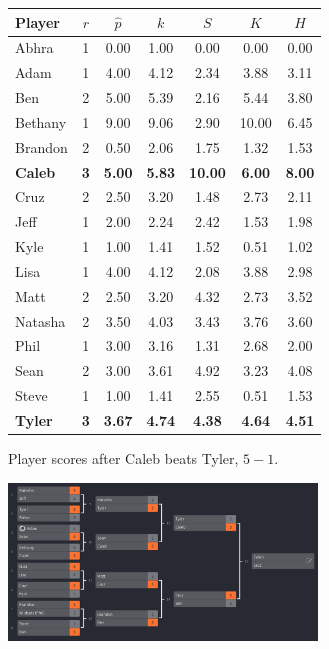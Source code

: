 \documentclass[letterpaper, 10 pt, conference]{ieeeconf}  %
\begin{document}
\begin{figure}
\begin{subfigure}[hb]{0.4\textwidth}
                \footnotesize
                \centering
                \begin{tabular}{lccc|ccc}
                        Player	&	$r$	&	$\hat{p}$	&	$k$	&	$S$	&	$K$	&	$H$	\\
                        \midrule													
                        Abhra	&	1	&	0.00	&	1.00	&	0.00	&	0.00	&	0.00	\\
                        Adam	&	1	&	4.00	&	4.12	&	2.34	&	3.88	&	3.11	\\
                        Ben	&	2	&	5.00	&	5.39	&	2.16	&	5.44	&	3.80	\\
                        Bethany	&	1	&	9.00	&	9.06	&	2.90	&	10.00	&	6.45	\\
                        Brandon	&	2	&	0.50	&	2.06	&	1.75	&	1.32	&	1.53	\\
                        \textbf{Caleb}	&	\textbf{3}	&	\textbf{5.00}	&	\textbf{5.83}	&	\textbf{10.00}	&	\textbf{6.00}	&	\textbf{8.00}	\\
                        Cruz	&	2	&	2.50	&	3.20	&	1.48	&	2.73	&	2.11	\\
                        Jeff	&	1	&	2.00	&	2.24	&	2.42	&	1.53	&	1.98	\\
                        Kyle	&	1	&	1.00	&	1.41	&	1.52	&	0.51	&	1.02	\\
                        Lisa	&	1	&	4.00	&	4.12	&	2.08	&	3.88	&	2.98	\\
                        Matt	&	2	&	2.50	&	3.20	&	4.32	&	2.73	&	3.52	\\
                        Natasha	&	2	&	3.50	&	4.03	&	3.43	&	3.76	&	3.60	\\
                        Phil	&	1	&	3.00	&	3.16	&	1.31	&	2.68	&	2.00	\\
                        Sean	&	2	&	3.00	&	3.61	&	4.92	&	3.23	&	4.08	\\
                        Steve	&	1	&	1.00	&	1.41	&	2.55	&	0.51	&	1.53	\\
                        \textbf{Tyler}	&	\textbf{3}	&	\textbf{3.67}	&	\textbf{4.74}	&	\textbf{4.38}	&	\textbf{4.64}	&	\textbf{4.51}	\\
                \end{tabular}
                \caption{Player scores after Caleb beats Tyler, $5-1$.}
        \end{subfigure}
        \begin{subfigure}[ht]{0.5\textwidth}
                \centering
                \includegraphics[width=0.9\textwidth]{fig/singles-bracket_6.png}

\end{subfigure}
\end{figure}
\end{document}
